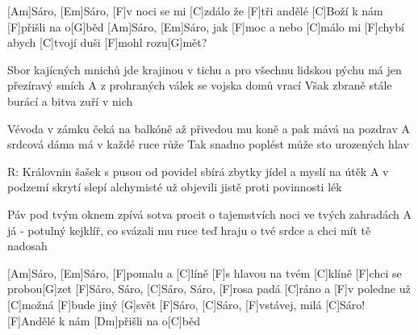 
[Am]Sáro, [Em]Sáro, [F]v noci se mi [C]zdálo 
že [F]tři andělé [C]Boží k nám [F]přišli na o[G]běd 
[Am]Sáro, [Em]Sáro, jak [F]moc a nebo [C]málo 
mi [F]chybí abych [C]tvojí duši [F]mohl rozu[G]mět? 

Sbor kajícných mnichů jde krajinou v tichu 
a pro všechnu lidskou pýchu 
má jen přezíravý smích 
A z prohraných válek se vojska domů vrací 
Však zbraně stále burácí 
a bitva zuří v nich 

Vévoda v zámku čeká na balkóně 
až přivedou mu koně 
a pak mává na pozdrav 
A srdcová dáma má v každé ruce růže 
Tak snadno poplést může 
sto urozených hlav 

R:
\slpc
Královnin šašek s pusou od povidel 
sbírá zbytky jídel 
a myslí na útěk 
A v podzemí skrytí slepí alchymisté 
už objevili jistě 
proti povinnosti lék 

Páv pod tvým oknem zpívá sotva procit 
o tajemstvích noci 
ve tvých zahradách 
A já - potulný kejklíř, co svázali mu ruce 
teď hraju o tvé srdce 
a chci mít tě nadosah 

[Am]Sáro, [Em]Sáro, [F]pomalu a [C]líně 
[F]s hlavou na tvém [C]klíně [F]chci se probou[G]zet 
[F]Sáro, Sáro, [C]Sáro, Sáro, [F]rosa padá [C]ráno 
a [F]v poledne už [C]možná [F]bude jiný [G]svět 
[F]Sáro, [C]Sáro, [F]vstávej, milá [C]Sáro! 
[F]Andělé k nám [Dm]přišli na o[C]běd

